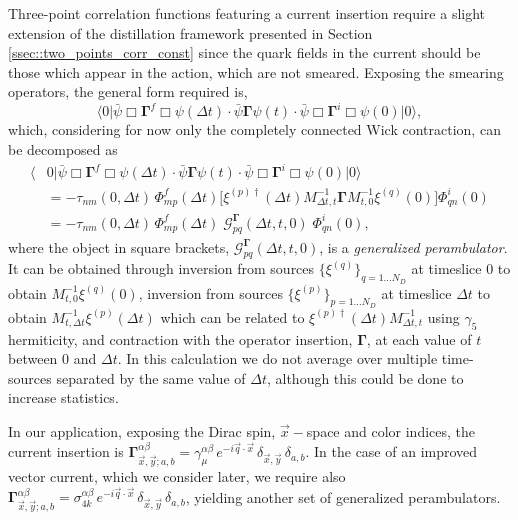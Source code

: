 \documentclass[twocolumn,amsmath,amssymb,prd,10pt,floatfix, 
superscriptaddress,nofootinbib, showpacs, preprintnumbers]{revtex4-1}
\begin{document}
Three-point correlation functions featuring a current insertion require a slight extension of the distillation framework presented in Section \ref{ssec::two_points_corr_const} since the quark fields in the current should be those which appear in the action, which are not smeared. Exposing the smearing operators, the general form required is, 
\begin{equation}
\big\langle 0 \big| \bar{\psi} \Box \mathbf{\Gamma}^f \Box \psi (\Delta t) \cdot  
					\bar{\psi} \mathbf{\Gamma} \psi (t) \cdot
					\bar{\psi} \Box \mathbf{\Gamma}^i \Box \psi (0) \big| 0 \big\rangle, \nonumber
\end{equation}
which, considering for now only the completely connected Wick contraction, can be decomposed as
\begin{align}
\big\langle &0 \big| \bar{\psi} \Box \mathbf{\Gamma}^f \Box \psi (\Delta t) \cdot  
					\bar{\psi} \mathbf{\Gamma} \psi (t) \cdot
					\bar{\psi} \Box \mathbf{\Gamma}^i \Box \psi (0) \big| 0 \big\rangle \nonumber \\
&= - \tau_{nm}(0,\Delta t)\, \Phi^f_{mp}(\Delta t)
 \Big[ \xi^{(p)\dag}(\Delta t) M^{-1}_{\Delta t, t} \mathbf{\Gamma} M^{-1}_{t,0} \xi^{(q)}(0) \Big]
 \Phi^i_{qn}(0) \nonumber \\
 &= - \tau_{nm}(0,\Delta t)\, \Phi^f_{mp}(\Delta t)
\; \mathcal{G}^\mathbf{\Gamma}_{pq}(\Delta t, t, 0) \;
 \Phi^i_{qn}(0), \nonumber
\end{align}
where the object in square brackets, $\mathcal{G}^\mathbf{\Gamma}_{pq}(\Delta t, t, 0)$, is a \emph{generalized perambulator}. It can be obtained through inversion from sources $\{ \xi^{(q)} \}_{q=1\ldots N_D}$ at timeslice 0 to obtain $M^{-1}_{t,0} \xi^{(q)}(0)$, inversion from sources $\{ \xi^{(p)} \}_{p=1\ldots N_D}$ at timeslice $\Delta t$ to obtain $M^{-1}_{t,\Delta t} \xi^{(p)}(\Delta t)$ which can be related to $\xi^{(p)\dag}(\Delta t) M^{-1}_{\Delta t, t}$ using $\gamma_5$ hermiticity, and contraction with the operator insertion, $\mathbf{\Gamma}$, at each value of $t$ between $0$ and $\Delta t$. In this calculation we do not average over multiple time-sources separated by the same value of $\Delta t$, although this could be done to increase statistics.

In our application, exposing the Dirac spin, $\vec{x}-$space and color indices, the current insertion is ${\mathbf{\Gamma}_{\vec{x},\vec{y};a,b}^{\alpha \beta} = \gamma_\mu^{\alpha \beta} \, e^{-i \vec{q} \cdot \vec{x} } \, \delta_{\vec{x},\vec{y}}\,  \delta_{a,b}}$.  In the case of an improved vector current, which we consider later, we require also ${\mathbf{\Gamma}_{\vec{x},\vec{y};a,b}^{\alpha \beta} = \sigma_{4k}^{\alpha \beta} \, e^{-i \vec{q} \cdot \vec{x} } \, \delta_{\vec{x},\vec{y}}\,  \delta_{a,b}}$, yielding another set of generalized perambulators.
\end{document}
